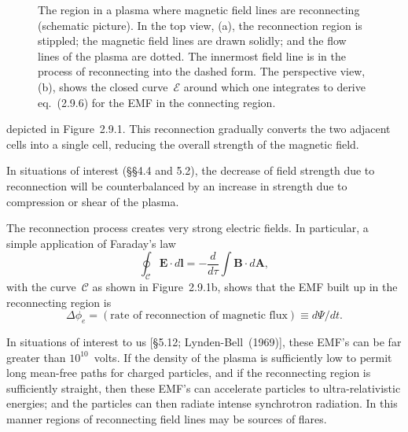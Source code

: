 \begin{figure}[htbp]
\centering
{}
\caption{The region in a plasma where magnetic field lines are
  reconnecting (schematic picture).  In the top view, (a), the
  reconnection region is stippled; the magnetic field lines are drawn
  solidly; and the flow lines of the plasma are dotted.  The innermost
  field line is in the process of reconnecting into the dashed form.
  The perspective view, (b), shows the closed curve~$\mathscr{E}$
  around which one integrates to derive eq.~(2.9.6) for the EMF in the
  connecting region.}
\label{fig:2.9.1}
\end{figure}

depicted in Figure~2.9.1.  This reconnection gradually converts the two adjacent
cells into a single cell, reducing the overall strength of the magnetic field.

In situations of interest (\S\S4.4 and 5.2), the decrease of field strength due
to reconnection will be counterbalanced by an increase in strength due to
compression or shear of the plasma.

The reconnection process creates very strong electric fields.  In particular,
a simple application of Faraday's law
%
\begin{equation}
\oint_{\mathscr{C}} \mathbf{E}\cdot d\mathbf{l}
  = -\frac{d}{d\tau}\!\int \mathbf{B}\cdot d\mathbf{A},
\end{equation}
%
with the curve~$\mathscr{C}$ as shown in Figure~2.9.1b, shows that the EMF built up
in the reconnecting region is
%
\begin{equation}
\Delta\phi_e
  = (\text{rate of reconnection of magnetic flux})
  \equiv d\Psi/dt.
\tag{2.9.6}
\end{equation}

In situations of interest to us [\S5.12; Lynden-Bell~(1969)\cite{LyndenBell1969}],
these EMF's can be far greater than $10^{10}$~volts.  If the density of the plasma is
sufficiently low to permit long mean-free paths for charged particles, and if the
reconnecting region is sufficiently straight, then these EMF's can accelerate
particles to ultra-relativistic energies; and the particles can then radiate intense
synchrotron radiation.  In this manner regions of reconnecting field lines may be
sources of flares.
